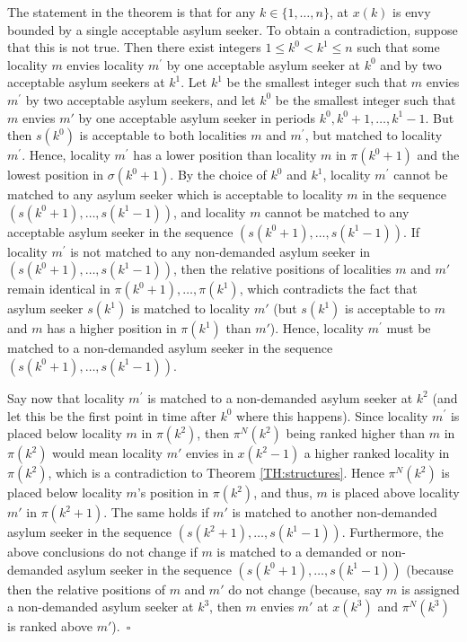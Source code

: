 \documentclass[12pt,fleqn]{article}
\begin{document}
The statement in the theorem is that for any $k\in \{1,\ldots,n\}$, at $x(k)$ is envy bounded by a single acceptable asylum seeker. To obtain a contradiction, suppose that this is not true. Then there exist integers $1\leq k^0 <k^1\leq n$ such that some locality $m$ envies locality $m^\prime$ by one acceptable asylum seeker at $k^0$ and by two acceptable asylum seekers at $k^1$. Let $k^1$ be the smallest integer such that $m$ envies $m^\prime$ by two acceptable asylum seekers, and let $k^0$ be the smallest integer such that $m$ envies $m'$ by one acceptable asylum seeker in periods $k^0,k^0+1,\ldots,k^1-1$.
But then $s(k^0)$ is acceptable to both localities $m$ and $m^\prime$, but matched to locality $m^\prime$. Hence, locality $m^\prime$ has a lower position than locality $m$ in $\pi(k^0+1)$ and the lowest position in $\sigma(k^0+1)$. By the choice of $k^0$ and $k^1$, locality $m^\prime$ cannot be matched to any asylum seeker which is acceptable to locality $m$ in the sequence $(s(k^0+1),\ldots,s(k^1-1))$, and locality $m$ cannot be matched to any acceptable asylum seeker in the sequence $(s(k^0+1),\ldots,s(k^1-1))$. If locality $m^\prime$ is not matched to any non-demanded asylum seeker in $(s(k^0+1),\ldots,s(k^1-1))$, then the relative positions of localities $m$ and $m'$ remain identical in $\pi(k^0+1),\ldots,\pi(k^1)$, which contradicts the fact that asylum seeker $s(k^1)$ is matched to locality $m'$ (but $s(k^1)$ is acceptable to $m$ and $m$ has a higher position in $\pi(k^1)$ than $m'$). Hence, locality $m^\prime$ must be matched to a non-demanded asylum seeker in the sequence $(s(k^0+1),\ldots,s(k^1-1))$.

Say now that locality $m^\prime$ is matched to a non-demanded asylum seeker at $k^2$ (and let this be the first point in time after $k^0$ where this happens). Since locality $m^\prime$ is placed below locality $m$ in $\pi(k^2)$, then $\pi^N(k^2)$ being ranked higher than $m$ in $\pi(k^2)$ would mean locality $m'$ envies in $x(k^2-1)$ a higher ranked locality in $\pi(k^2)$, which is a contradiction to Theorem \ref{TH:structures}. Hence $\pi^N(k^2)$ is placed below locality $m$'s position in $\pi(k^2)$, and thus, $m$ is placed above locality $m'$ in $\pi(k^2+1)$. The same holds if $m'$ is matched to another non-demanded asylum seeker in the sequence $(s(k^2+1),\ldots,s(k^1-1))$. Furthermore, the above conclusions do not change if $m$ is matched to a demanded or non-demanded asylum seeker in the sequence $(s(k^0+1),\ldots,s(k^1-1))$ (because then the relative positions of $m$ and $m'$ do not change (because, say $m$ is assigned a non-demanded asylum seeker at $k^3$, then $m$ envies $m'$ at $x(k^3)$ and $\pi^N(k^3)$ is ranked above $m'$).~\hfill$\square$
\end{document}
